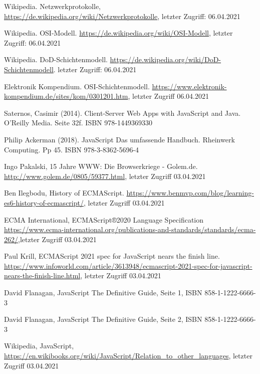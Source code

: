 \documentclass[11pt,a4paper]{article}
\begin{document}
\begin{itemize}
%
%
%
%

 Wikipedia. Netzwerkprotokolle, \url{https://de.wikipedia.org/wiki/Netzwerkprotokolle}, letzter Zugriff: 06.04.2021

  Wikipedia. OSI-Modell. \url{https://de.wikipedia.org/wiki/OSI-Modell}, letzter Zugriff: 06.04.2021

 Wikipedia. DoD-Schichtenmodell. \url{https://de.wikipedia.org/wiki/DoD-Schichtenmodell}. letzter Zugriff: 06.04.2021

 Elektronik Kompendium. OSI-Schichtenmodell. \url{https://www.elektronik-kompendium.de/sites/kom/0301201.htm}, letzter Zugriff 06.04.2021

%
%
%
%

 Saternos, Casimir (2014). Client-Server Web Apps with JavaScript and Java. O'Reilly Media. Seite 32f. ISBN 978-1449369330

 Philip Ackerman (2018). JavaScript Das umfassende Handbuch. Rheinwerk Computing. Pp 45. ISBN 978-3-8362-5696-4

 Ingo Pakalski, 15 Jahre WWW: Die Browserkriege - Golem.de. \url{http://www.golem.de/0805/59377.html}, letzter Zugriff 03.04.2021

 Ben Ilegbodu, History of ECMAScript. 
\url{https://www.benmvp.com/blog/learning-es6-history-of-ecmascript/}, letzter Zugriff 03.04.2021

 ECMA International, ECMAScript®2020 Language Specification \url{https://www.ecma-international.org/publications-and-standards/standards/ecma-262/},letzter Zugriff 03.04.2021

 Paul Krill, ECMAScript 2021 spec for JavaScript nears the finish line. \url{https://www.infoworld.com/article/3613948/ecmascript-2021-spec-for-javascript-nears-the-finish-line.html}, letzter Zugriff 03.04.2021

 David Flanagan, JavaScript The Definitive Guide,  Seite 1, ISBN 858-1-1222-6666-3

 David Flanagan, JavaScript The Definitive Guide,  Seite 2, ISBN 858-1-1222-6666-3

 Wikipedia, JavaScript, \url{https://en.wikibooks.org/wiki/JavaScript/Relation_to_other_languages}, letzter Zugriff 03.04.2021


\end{itemize}
\end{document}
